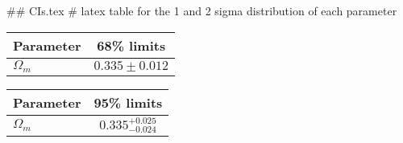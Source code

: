## CIs.tex
# latex table for the 1 and 2 sigma distribution of each parameter

\begin{tabular} { l  c}
 Parameter &  68\% limits\\
\hline
{\boldmath$\Omega_m       $} & $0.335\pm 0.012            $\\
\hline
\end{tabular}

\begin{tabular} { l  c}
 Parameter &  95\% limits\\
\hline
{\boldmath$\Omega_m       $} & $0.335^{+0.025}_{-0.024}   $\\
\hline
\end{tabular}
